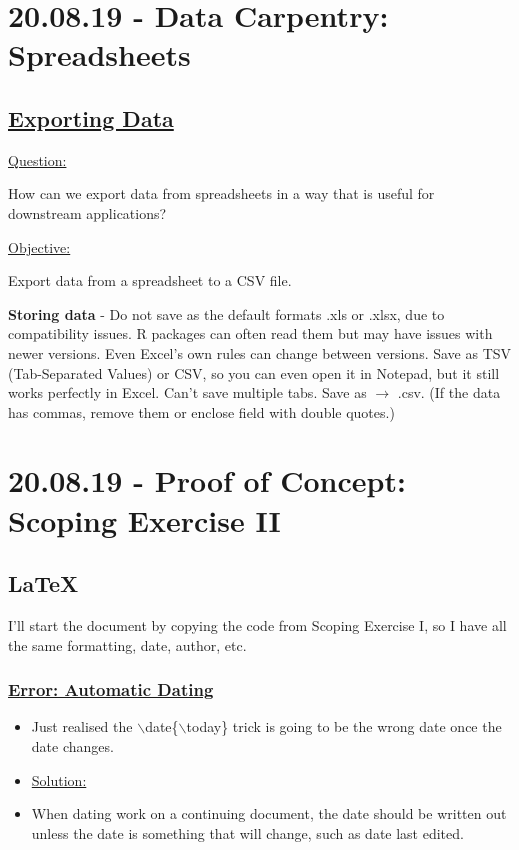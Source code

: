 \documentclass[12pt]{article}
\begin{document}
\color{black}
\vspace{1em}
\section{20.08.19 - Data Carpentry: Spreadsheets}

\subsection{\href{https://datacarpentry.org/spreadsheets-socialsci/05-exporting-data/index.html}{\textbf{Exporting Data}}}

\color{gray}
\underline{Question:}

How can we export data from spreadsheets in a way that is useful for downstream applications?

\underline{Objective:}

Export data from a spreadsheet to a CSV file.

\color{black}

\textbf{Storing data} - Do not save as the default formats .xls or .xlsx, due to compatibility issues. R packages can often read them but may have issues with newer versions. Even Excel's own rules can change between versions. Save as TSV (Tab-Separated Values) or CSV, so you can even open it in Notepad, but it still works perfectly in Excel. Can't save multiple tabs. Save as $\rightarrow$ .csv. (If the data has commas, remove them or enclose field with double quotes.)

\newpage\section{20.08.19 - Proof of Concept: Scoping Exercise II}

\subsection{LaTeX}
\vspace{1em}
I'll start the document by copying the code from Scoping Exercise I, so I have all the same formatting, date, author, etc.

\subsubsection{\underline{Error: Automatic Dating}}\label{error:er10}
\begin{itemize}
    \item Just realised the $\backslash$date\{$\backslash$today\} trick is going to be the wrong date once the date changes.
\end{itemize}
\begin{itemize}
\renewcommand{\labelitemi}{$\nobullet$}
\item \underline{Solution:}
\renewcommand{\labelitemi}{$\bullet$}
    \item When dating work on a continuing document, the date should be written out unless the date is something that will change, such as date last edited.
\end{itemize}
\end{document}
